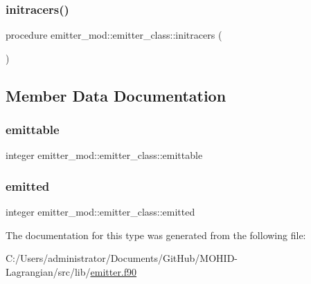 \subsubsection{\texorpdfstring{initracers()}{initracers()}}
{\footnotesize\ttfamily procedure emitter\+\_\+mod\+::emitter\+\_\+class\+::initracers (\begin{DoxyParamCaption}{ }\end{DoxyParamCaption})\hspace{0.3cm}{\ttfamily [private]}}



\subsection{Member Data Documentation}
\mbox{\label{structemitter__mod_1_1emitter__class_a201a8b070193b7217c5a5c8973d76cd6}} 
\subsubsection{\texorpdfstring{emittable}{emittable}}
{\footnotesize\ttfamily integer emitter\+\_\+mod\+::emitter\+\_\+class\+::emittable\hspace{0.3cm}{\ttfamily [private]}}

\mbox{\label{structemitter__mod_1_1emitter__class_aa8f56d34f32e452a2e78f93f44780b4b}} 
\subsubsection{\texorpdfstring{emitted}{emitted}}
{\footnotesize\ttfamily integer emitter\+\_\+mod\+::emitter\+\_\+class\+::emitted\hspace{0.3cm}{\ttfamily [private]}}



The documentation for this type was generated from the following file\+:\begin{DoxyCompactItemize}
\item 
C\+:/\+Users/administrator/\+Documents/\+Git\+Hub/\+M\+O\+H\+I\+D-\/\+Lagrangian/src/lib/\hyperlink{emitter_8f90}{emitter.\+f90}\end{DoxyCompactItemize}
